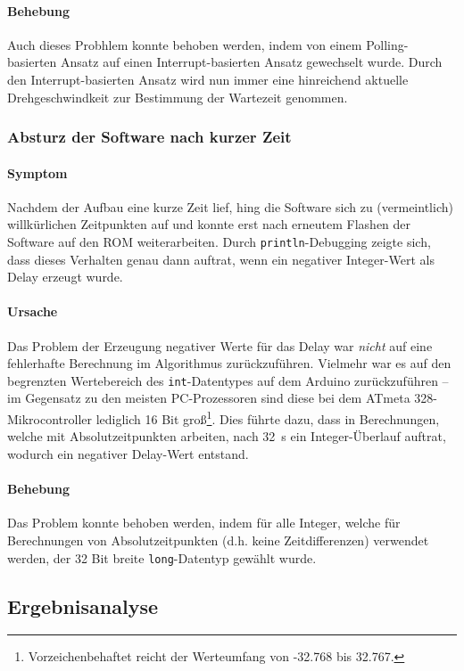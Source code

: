 \documentclass{kis}
\begin{document}
\paragraph{Behebung}
Auch dieses Probhlem konnte behoben werden, indem von einem Polling-basierten Ansatz auf einen Interrupt-basierten Ansatz gewechselt wurde. Durch den Interrupt-basierten Ansatz wird nun immer eine hinreichend aktuelle Drehgeschwindkeit zur Bestimmung der Wartezeit genommen. 

\subsubsection{Absturz der Software nach kurzer Zeit}
\paragraph{Symptom}
Nachdem der Aufbau eine kurze Zeit lief, hing die Software sich zu (vermeintlich) willkürlichen Zeitpunkten auf und konnte erst nach erneutem Flashen der Software auf den ROM weiterarbeiten. Durch \texttt{println}-Debugging zeigte sich, dass dieses Verhalten genau dann auftrat, wenn ein negativer Integer-Wert als Delay erzeugt wurde.

\paragraph{Ursache}
Das Problem der Erzeugung negativer Werte für das Delay war \emph{nicht} auf eine fehlerhafte Berechnung im Algorithmus zurückzuführen. Vielmehr war es auf den begrenzten Wertebereich des \texttt{int}-Datentypes auf dem Arduino zurückzuführen -- im Gegensatz zu den meisten PC-Prozessoren sind diese bei dem ATmeta 328-Mikrocontroller lediglich 16 Bit groß\footnote{Vorzeichenbehaftet reicht der Werteumfang von -32.768 bis 32.767.}. Dies führte dazu, dass in Berechnungen, welche mit Absolutzeitpunkten arbeiten, nach 32~s ein Integer-Überlauf auftrat, wodurch ein negativer Delay-Wert entstand.

\paragraph{Behebung}
Das Problem konnte behoben werden, indem für alle Integer, welche für Berechnungen von Absolutzeitpunkten (d.h. keine Zeitdifferenzen) verwendet werden, der 32 Bit breite \texttt{long}-Datentyp gewählt wurde.

\newpage
\subsection{Ergebnisanalyse}
\end{document}
